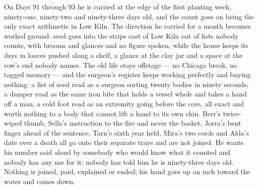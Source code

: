 \documentclass{design/chronicle}
\begin{document}
{On Days 91 through 93 he is carried at the edge of the first planting week, ninety-one, ninety-two and ninety-three days old, and the count goes on being the only exact arithmetic in Low Kiln. The direction he carried for a month becomes worked ground: seed goes into the strips east of Low Kiln out of fists nobody counts, with brooms and glances and no figure spoken, while the house keeps its days in loaves pushed along a shelf, a glance at the clay jar and a space at the row’s end nobody names. The old life stays offstage --- no Chicago break, no tagged memory --- and the surgeon’s register keeps working perfectly and buying nothing: a fist of seed read as a surgeon sorting twenty bodies in ninety seconds, a damper read as the same iron bite that holds a vessel whole and takes a hand off a man, a cold foot read as an extremity going before the core, all exact and worth nothing to a body that cannot lift a hand to its own chin. Berr’s twice-wiped thumb, Sella’s instruction to the fire and never the basket, Jorra’s bent finger ahead of the sentence, Tarn’s sixth year held, Mira’s two cords and Alda’s date over a death all go onto their separate trays and are not joined. He wants his number said aloud by somebody who would know what it counted and nobody has any use for it; nobody has told him he is ninety-three days old. Nothing is joined, paid, explained or ended; his hand goes up an inch toward the water and comes down.

}
\end{document}
